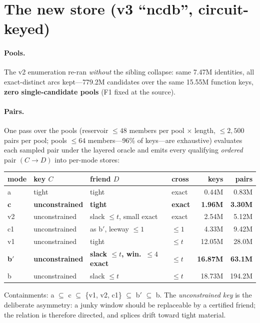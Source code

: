 \documentclass[11pt]{article}
\begin{document}
\section{The new store (v3 ``ncdb'', circuit-keyed)}

\paragraph{Pools.} The v2 enumeration re-ran \emph{without} the sibling
collapse: same 7.47M identities, all exact-distinct arcs kept---779.2M
candidates over the same 15.55M function keys, \textbf{zero
single-candidate pools} (F1 fixed at the source).

\paragraph{Pairs.} One pass over the pools (reservoir $\le 48$ members per
pool $\times$ length, $\le 2{,}500$ pairs per pool; pools $\le 64$
members---96\% of keys---are exhaustive) evaluates each sampled pair under
the layered oracle and emits every qualifying \emph{ordered} pair
$(C\to D)$ into per-mode stores:

\begin{center}
\begin{tabular}{llllrr}
\toprule
mode & key $C$ & friend $D$ & cross & keys & pairs\\
\midrule
a  & tight & tight & exact & 0.44M & 0.83M\\
\textbf{c} & \textbf{unconstrained} & \textbf{tight} & \textbf{exact} & \textbf{1.96M} & \textbf{3.30M}\\
v2 & unconstrained & slack $\le t$, small exact & exact & 2.54M & 5.12M\\
c1 & unconstrained & as b$'$, leeway $\le 1$ & $\le 1$ & 4.33M & 9.42M\\
v1 & unconstrained & tight & $\le t$ & 12.05M & 28.0M\\
\textbf{b$'$} & \textbf{unconstrained} & \textbf{slack $\le t$, win.\ $\le4$ exact} & \textbf{$\le t$} & \textbf{16.87M} & \textbf{63.1M}\\
b  & unconstrained & slack $\le t$ & $\le t$ & 18.73M & 194.2M\\
\bottomrule
\end{tabular}
\end{center}

\noindent Containments: a $\subseteq$ c $\subseteq$ \{v1, v2, c1\}
$\subseteq$ b$'$ $\subseteq$ b. The \emph{unconstrained key} is the
deliberate asymmetry: a junky window should be replaceable by a certified
friend; the relation is therefore directed, and splices drift toward tight
material.
\end{document}
